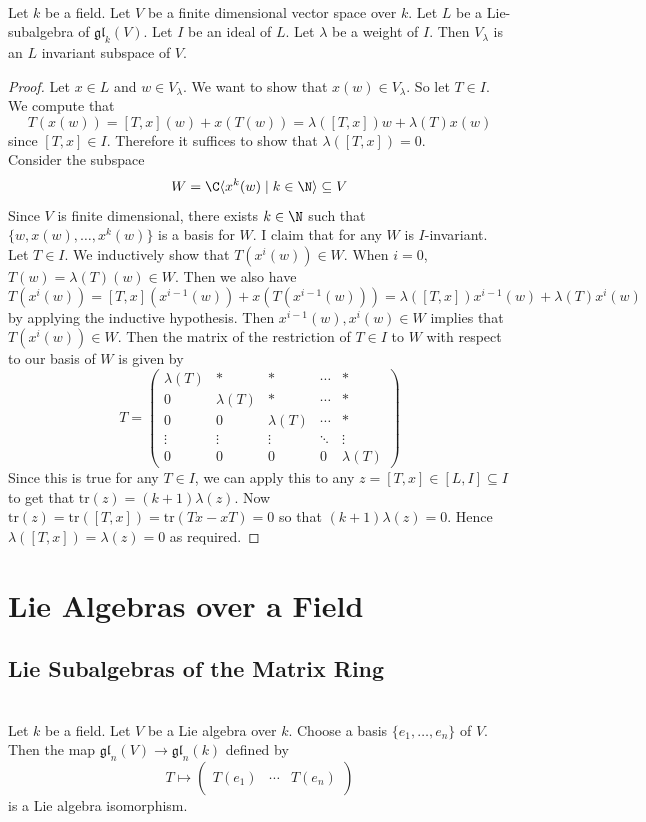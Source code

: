 \documentclass[a4paper]{article}
\begin{document}
\begin{prp}{}{} \\Let $k$ be a field. Let $V$ be a finite dimensional vector space over $k$. Let $L$ be a Lie-subalgebra of $\mathfrak{gl}_k(V)$. Let $I$ be an ideal of $L$. Let $\lambda$ be a weight of $I$. Then $V_\lambda$ is an $L$ invariant subspace of $V$. 
\begin{proof}
Let $x\in L$ and $w\in V_\lambda$. We want to show that $x(w)\in V_\lambda$. So let $T\in I$. We compute that $$T(x(w))=[T,x](w)+x(T(w))=\lambda([T,x])w+\lambda(T)x(w)$$ since $[T,x]\in I$. Therefore it suffices to show that $\lambda([T,x])=0$. \\

Consider the subspace $$W=\C\langle x^k(w)\;|\;k\in\N\rangle\subseteq V$$ Since $V$ is finite dimensional, there exists $k\in\N$ such that $\{w,x(w),\dots,x^k(w)\}$ is a basis for $W$. I claim that for any $W$ is $I$-invariant. Let $T\in I$. We inductively show that $T(x^i(w))\in W$. When $i=0$, $T(w)=\lambda(T)(w)\in W$. Then we also have $$T(x^i(w))=[T,x](x^{i-1}(w))+x(T(x^{i-1}(w)))=\lambda([T,x])x^{i-1}(w)+\lambda(T)x^i(w)$$ by applying the inductive hypothesis. Then $x^{i-1}(w),x^i(w)\in W$ implies that $T(x^i(w))\in W$. Then the matrix of the restriction of $T\in I$ to $W$ with respect to our basis of $W$ is given by $$T=\begin{pmatrix}
\lambda(T) & \ast & \ast & \cdots & \ast\\
0 & \lambda(T) & \ast & \cdots & \ast\\
0 & 0 & \lambda(T) & \cdots & \ast\\
\vdots & \vdots & \vdots & \ddots & \vdots\\
0 & 0 & 0 & 0 & \lambda(T)
\end{pmatrix}$$
Since this is true for any $T\in I$, we can apply this to any $z=[T,x]\in [L,I]\subseteq I$ to get that $\text{tr}(z)=(k+1)\lambda(z)$. Now $\text{tr}(z)=\text{tr}([T,x])=\text{tr}(Tx-xT)=0$ so that $(k+1)\lambda(z)=0$. Hence $\lambda([T,x])=\lambda(z)=0$ as required. 
\end{proof}
\end{prp}

\pagebreak
\section{Lie Algebras over a Field}
\subsection{Lie Subalgebras of the Matrix Ring}
\begin{prp}{}{}\\
Let $k$ be a field. Let $V$ be a Lie algebra over $k$. Choose a basis $\{e_1,\dots,e_n\}$ of $V$. Then the map $\mathfrak{gl}_n(V)\to\mathfrak{gl}_n(k)$ defined by $$T\mapsto\begin{pmatrix}&&\\
T(e_1) & \cdots & T(e_n)\\
&&
\end{pmatrix}$$ is a Lie algebra isomorphism. 
\end{prp}
\end{document}
